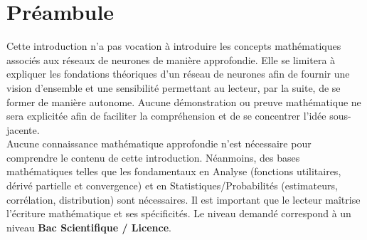 \section{Préambule}
Cette introduction n'a pas vocation à introduire les concepts mathématiques associés aux réseaux de neurones de manière approfondie. Elle se limitera à expliquer les fondations théoriques d'un réseau de neurones afin de fournir une vision d'ensemble et une sensibilité permettant au lecteur, par la suite, de se former de manière autonome. Aucune démonstration ou preuve mathématique ne sera explicitée afin de faciliter la compréhension et de se concentrer l'idée sous-jacente.\\

\noindent Aucune connaissance mathématique approfondie n'est nécessaire pour comprendre le contenu de cette introduction. Néanmoins, des bases mathématiques telles que les fondamentaux en Analyse (fonctions utilitaires, dérivé partielle et convergence) et en Statistiques/Probabilités (estimateurs, corrélation, distribution) sont nécessaires. Il est important que le lecteur maîtrise l'écriture mathématique et ses spécificités. Le niveau demandé correspond à un niveau \textbf{Bac Scientifique / Licence}.